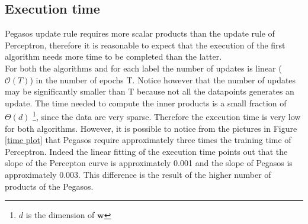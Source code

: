 \documentclass{article}
\begin{document}
  \subsection{Execution time}
Pegasos update rule requires more scalar products than the update rule of Perceptron, therefore it is reasonable to expect that the execution of the first algorithm needs more time to be completed than the latter.\\
For both the algorithms and for each label the number of updates is linear ($\mathcal{O}(T)$) in the number of epochs T. Notice however that the number of updates may be significantly smaller than T because not all the datapoints generates an update. The time needed to compute the inner products is a small fraction of $\Theta(d)$ \footnote{$d$ is the dimension of $\textbf{w}$}, since the data are very sparse. Therefore the execution time is very low for both algorithms. However, it is possible to notice from the pictures in Figure \ref{time plot} that Pegasos require approximately three times the training time of Perceptron.  Indeed the linear fitting of the execution time points out that the slope of the Percepton curve is approximately 0.001 and the slope of Pegasos is approximately 0.003. This difference is the result of the higher number of products of the Pegasos. 
\end{document}
